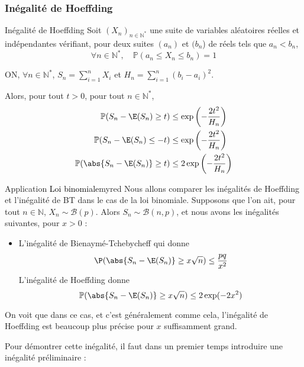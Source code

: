     \subsubsection{Inégalité de Hoeffding}

    \begin{theo}{Inégalité de Hoeffding}
        Soit $(X_n)_{n \in \mathbb{N}^*}$ une suite de variables aléatoires réelles et indépendantes vérifiant, pour deux suites $(a_n)$ et $(b_n$) de réels tels que $a_n < b_n$, 
        \[ \forall n \in \mathbb{N}^*, \quad \mathbb{P}(a_n \leq X_n \leq b_n) = 1 \]   
        
        ON, $\forall n \in \mathbb{N}^*$, $S_n = \sum_{i=1}^n X_i$ et $H_n = \sum_{i = 1}^n (b_i-a_i)^2$.

        Alors, pour tout $t > 0$, pour tout $n \in \mathbb{N}^*$, 
        \begin{align*}
            \mathbb{P}(S_n - \E(S_n) \geq t) &\leq \exp\left(-\frac{2t^2}{H_n}\right) \\
            \mathbb{P}(S_n - \E(S_n) \leq -t) &\leq \exp\left(-\frac{2t^2}{H_n}\right) \\
            \mathbb{P}(\abs{S_n - \E(S_n)} \geq t) &\leq 2 \exp\left(-\frac{2t^2}{H_n}\right)
        \end{align*}
    \end{theo}

    \begin{omed}{Application \textcolor{black}{Loi binomiale}}{myred}
        Nous allons comparer les inégalités de Hoeffding et l’inégalité de BT dans le cas de la loi binomiale. Supposons que l’on ait, pour tout $n \in \mathbb{N}$, $X_n \sim \mathcal{B}(p)$. Alors $S_n \sim \mathcal{B}(n,p)$, et nous avons les inégalités suivantes, pour $x > 0$ : 
        \begin{itemize}
            \item L’inégalité de Bienaymé-Tchebycheff qui donne 
            \[ \P(\abs{S_n - \E(S_n)} \geq x \sqrt{n}) \leq \frac{pq}{x^2} \]   
            L’inégalité de Hoeffding donne 
            \[ \mathbb{P}(\abs{S_n - \E(S_n)} \geq x \sqrt{n}) \leq 2 \exp(-2x^2) \]   
        \end{itemize}
        On voit que dans ce cas, et c’est généralement comme cela, l’inégalité de Hoeffding est beaucoup plus précise pour $x$ suffisamment grand.
    \end{omed}

    Pour démontrer cette inégalité, il faut dans un premier temps introduire une inégalité préliminaire :

